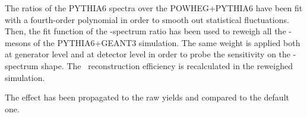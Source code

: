 The ratios of the PYTHIA6 spectra over the POWHEG+PYTHIA6 have been fit with a fourth-order polynomial in order to smooth out statistical fluctuations. Then, the fit function of the \ptd-spectrum ratio has been used to reweigh all the \Dzero-mesons of the PYTHIA6+GEANT3 simulation. The same weight is applied both at generator level and at detector level in order to probe the sensitivity on the \pt-spectrum shape. The \Dstar\ reconstruction efficiency is recalculated in the reweighed simulation. 
%

The effect has been propagated to the raw yields and compared to the default one. 
%

